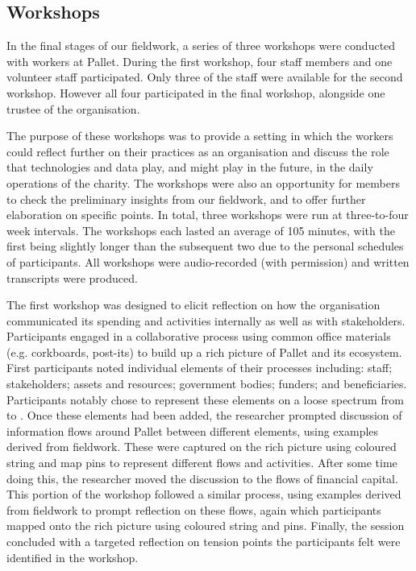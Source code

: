 \subsection{Workshops}
In the final stages of our fieldwork, a series of three workshops were conducted with workers at Pallet. During the first workshop, four staff members and one volunteer staff participated. Only three of the staff were available for the second workshop. However all four participated in the final workshop, alongside one trustee of the organisation.

The purpose of these workshops was to provide a setting in which the workers could reflect further on their practices as an organisation and discuss the role that technologies and data play, and might play in the future, in the daily operations of the charity. The workshops were also an opportunity for members to check the preliminary insights from our fieldwork, and to offer further elaboration on specific points. In total, three workshops were run at three-to-four week intervals. The workshops each lasted an average of 105 minutes, with the first being slightly longer than the subsequent two due to the personal schedules of participants. All workshops were audio-recorded (with permission) and written transcripts were produced.

The first workshop was designed to elicit reflection on how the organisation communicated its spending and activities internally as well as with stakeholders. Participants engaged in a collaborative process using common office materials (e.g. corkboards, post-its) to build up a rich picture \cite{monk_methods_1998} of Pallet and its ecosystem. First participants noted individual elements of their processes including: staff; stakeholders; assets and resources; government bodies; funders; and beneficiaries. Participants notably chose to represent these elements on a loose spectrum from  to . Once these elements had been added, the researcher prompted discussion of information flows around Pallet between different elements, using examples derived from fieldwork. These were captured on the rich picture using coloured string and map pins to represent different flows and activities. After some time doing this, the researcher moved the discussion to the flows of financial capital. This portion of the workshop followed a similar process, using examples derived from fieldwork to prompt reflection on these flows, again which participants mapped onto the rich picture using coloured string and pins. Finally, the session concluded with a targeted reflection on tension points the participants felt were identified in the workshop.

